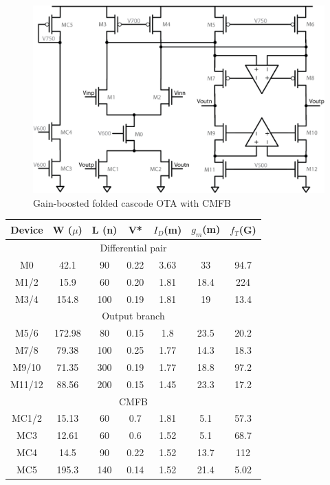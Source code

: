 \documentclass[conference]{IEEEtran}
\begin{document}
\begin{figure}[h]
\centering
\includegraphics[width=\linewidth]{illus/main_ota}
\caption{Gain-boosted folded cascode OTA with CMFB}
\label{fig:main-ota}
\end{figure}

\begin{center}
\begin{tabular}{|c|c|c|c|c|c|c|} 
\hline
Device & W ($\mu$) & L (n) & V* & $I_D$(m) & $g_m$(m) & $f_T$(G) \\
\hline
\multicolumn{7}{|c|}{Differential pair} \\
\hline
M0 &	 42.1 & 90 & 0.22 & 3.63 & 33 & 94.7 \\
\hline
M1/2 &  15.9 & 60 & 0.20 & 1.81 & 18.4 & 224 \\
\hline
M3/4 & 154.8 & 100 & 0.19 & 1.81 & 19 & 13.4 \\
\hline
\multicolumn{7}{|c|}{Output branch} \\
\hline
M5/6 & 172.98 & 80 & 0.15 & 1.8 & 23.5 & 20.2 \\
\hline
M7/8 & 79.38 & 100 & 0.25 & 1.77 & 14.3 & 18.3 \\
\hline
M9/10 & 71.35 & 300 & 0.19 & 1.77 & 18.8 & 97.2 \\
\hline
M11/12 & 88.56 & 200 & 0.15 & 1.45 & 23.3 & 17.2 \\ %
\hline
\multicolumn{7}{|c|}{CMFB} \\
\hline
MC1/2 & 15.13 & 60 & 0.7 & 1.81 & 5.1 & 57.3 \\
\hline
MC3 & 12.61 & 60 & 0.6 & 1.52 & 5.1 & 68.7 \\
\hline
MC4 & 14.5 & 90 & 0.22 & 1.52 & 13.7 & 112 \\
\hline
MC5 & 195.3 & 140 & 0.14 & 1.52 & 21.4 & 5.02 \\
\hline
\end{tabular}
\end{center}
\end{document}
